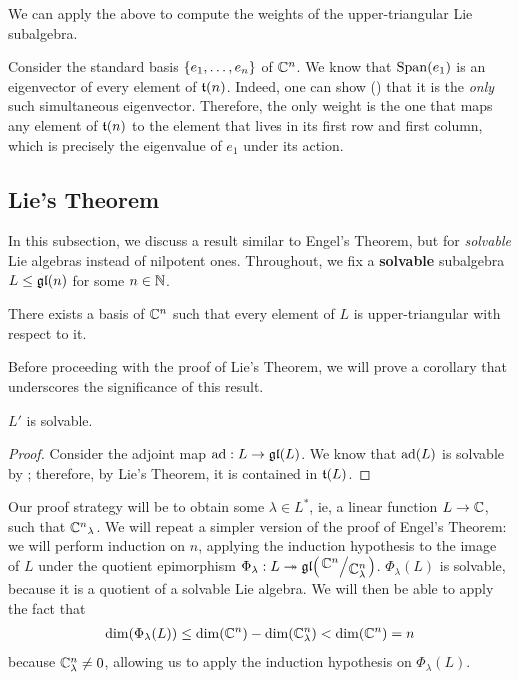 We can apply the above to compute the weights of the upper-triangular Lie subalgebra.

\begin{boxexample}[$\t{n}$]
    Consider the standard basis $\left\{ e_1, \ldots, e_n \right\}$ of $\mathbb{C}^n$. We know that $\operatorname{Span}\!\left( e_1 \right)$ is an eigenvector of every element of $\t{n}$. Indeed, one can show (\sorry) that it is the \textit{only} such simultaneous eigenvector. Therefore, the only weight is the one that maps any element of $\t{n}$ to the element that lives in its first row and first column, which is precisely the eigenvalue of $e_1$ under its action. \sorry
\end{boxexample}

\subsection{Lie's Theorem}

In this subsection, we discuss a result similar to Engel's Theorem, but for \textit{solvable} Lie algebras instead of nilpotent ones. Throughout, we fix a \textbf{solvable} subalgebra $L \leq \mathfrak{gl}\!\left( n \right)$ for some $n \in \mathbb{N}$.

\begin{boxtheorem}\label{Ch1:Thm:Lie}
    There exists a basis of $\mathbb{C}^n$ such that every element of $L$ is upper-triangular with respect to it.
\end{boxtheorem}

Before proceeding with the proof of Lie's Theorem, we will prove a corollary that underscores the significance of this result.

\begin{boxcorollary}\label{Ch1:Cor:SolvableDerivNilpotent}
    $L'$ is solvable.
\end{boxcorollary}
\begin{proof}
    Consider the adjoint map $\operatorname{ad} : L \to \mathfrak{gl}\!\left( L \right)$. We know that $\operatorname{ad}\!\left( L \right)$ is solvable by \sorry; therefore, by Lie's Theorem, it is contained in $\mathfrak{t}\!\left( L \right)$. %
    \sorry
\end{proof}

Our proof strategy will be to obtain some $\lambda \in L^*$, ie, a linear function $L \to \mathbb{C}$, such that ${\mathbb{C}^n}_{\lambda}$. We will repeat a simpler version of the proof of Engel's Theorem: we will perform induction on $n$, applying the induction hypothesis to the image of $L$ under the quotient epimorphism $\Phi_\lambda : L \surj \gl{\quotient{\C^n}{\C^n_\lambda}}$. $\Phi_\lambda(L)$ is solvable, because it is a quotient of a solvable Lie algebra. We will then be able to apply the fact that
\begin{align*}
    \dim\!\left( \Phi_\lambda(L) \right)
    \leq \dim\!\left( \mathbb{C}^n \right) - \dim\!\left( \mathbb{C}^n_\lambda \right)
    < \dim\!\left( \mathbb{C}^n \right) = n
\end{align*}
because $\mathbb{C}^n_{\lambda} \neq 0$, allowing us to apply the induction hypothesis on $\Phi_\lambda(L)$.

